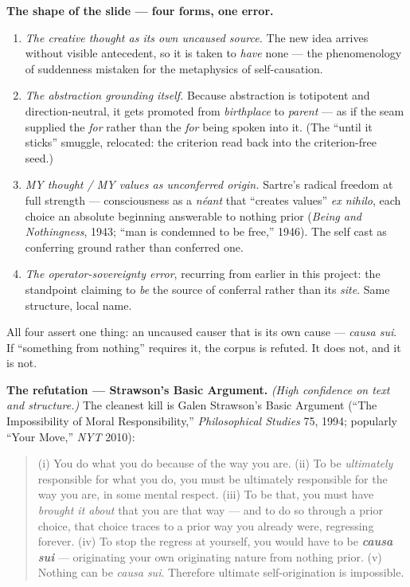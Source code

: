 \documentclass[11pt]{article}
\begin{document}
\textbf{The shape of the slide — four forms, one error.}

\begin{enumerate}
\item \emph{The creative thought as its own uncaused source.} The new idea arrives without visible antecedent, so it is taken to \emph{have} none — the phenomenology of suddenness mistaken for the metaphysics of self-causation.
\item \emph{The abstraction grounding itself.} Because abstraction is totipotent and direction-neutral, it gets promoted from \emph{birthplace} to \emph{parent} — as if the seam supplied the \emph{for} rather than the \emph{for} being spoken into it. (The ``until it sticks'' smuggle, relocated: the criterion read back into the criterion-free seed.)
\item \emph{MY thought /\allowbreak{} MY values as unconferred origin.} Sartre's radical freedom at full strength — consciousness as a \emph{néant} that ``creates values'' \emph{ex nihilo}, each choice an absolute beginning answerable to nothing prior (\emph{Being and Nothingness}, 1943; ``man is condemned to be free,'' 1946). The self cast as conferring ground rather than conferred one.
\item \emph{The operator-sovereignty error}, recurring from earlier in this project: the standpoint claiming to \emph{be} the source of conferral rather than its \emph{site}. Same structure, local name.
\end{enumerate}

All four assert one thing: an uncaused causer that is its own cause — \emph{causa sui}. If ``something from nothing'' requires it, the corpus is refuted. It does not, and it is not.

\textbf{The refutation — Strawson's Basic Argument.} \emph{(High confidence on text and structure.)} The cleanest kill is Galen Strawson's Basic Argument (``The Impossibility of Moral Responsibility,'' \emph{Philosophical Studies} 75, 1994; popularly ``Your Move,'' \emph{NYT} 2010):

\begin{quote}
(i) You do what you do because of the way you are. (ii) To be \emph{ultimately} responsible for what you do, you must be ultimately responsible for the way you are, in some mental respect. (iii) To be that, you must have \emph{brought it about} that you are that way — and to do so through a prior choice, that choice traces to a prior way you already were, regressing forever. (iv) To stop the regress at yourself, you would have to be \textbf{\emph{causa sui}} — originating your own originating nature from nothing prior. (v) Nothing can be \emph{causa sui}. Therefore ultimate self-origination is impossible.
\end{quote}
\end{document}
